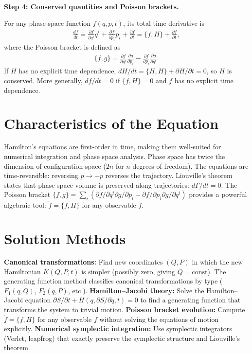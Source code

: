\documentclass[11pt,openright]{book}
\begin{document}
\textbf{Step 4: Conserved quantities and Poisson brackets.}

For any phase-space function $f(q, p, t)$, its total time derivative is
\begin{align}
\frac{df}{dt} = \frac{\partial f}{\partial q^i}\dot{q}^i + \frac{\partial f}{\partial p_i}\dot{p}_i + \frac{\partial f}{\partial t} = \{f, H\} + \frac{\partial f}{\partial t},
\end{align}
where the Poisson bracket is defined as
\begin{align}
\{f, g\} = \frac{\partial f}{\partial q^i}\frac{\partial g}{\partial p_i} - \frac{\partial f}{\partial p_i}\frac{\partial g}{\partial q^i}.
\end{align}
If $H$ has no explicit time dependence, $dH/dt = \{H, H\} + \partial H/\partial t = 0$, so $H$ is conserved. More generally, $df/dt = 0$ if $\{f, H\} = 0$ and $f$ has no explicit time dependence.

\section*{Characteristics of the Equation}

Hamilton's equations are first-order in time, making them well-suited for numerical integration and phase space analysis. Phase space has twice the dimension of configuration space ($2n$ for $n$ degrees of freedom). The equations are time-reversible: reversing $p \to -p$ reverses the trajectory. Liouville's theorem states that phase space volume is preserved along trajectories: $d\Gamma/dt = 0$. The Poisson bracket $\{f, g\} = \sum_i(\partial f/\partial q^i \partial g/\partial p_i - \partial f/\partial p_i \partial g/\partial q^i)$ provides a powerful algebraic tool: $\dot{f} = \{f, H\}$ for any observable $f$.
\section*{Solution Methods}

\textbf{Canonical transformations:} Find new coordinates $(Q, P)$ in which the new Hamiltonian $K(Q, P, t)$ is simpler (possibly zero, giving $Q = \text{const}$). The generating function method classifies canonical transformations by type ($F_1(q,Q)$, $F_2(q,P)$, etc.). \textbf{Hamilton--Jacobi theory:} Solve the Hamilton--Jacobi equation $\partial S/\partial t + H(q, \partial S/\partial q, t) = 0$ to find a generating function that transforms the system to trivial motion. \textbf{Poisson bracket evolution:} Compute $\dot{f} = \{f, H\}$ for any observable $f$ without solving the equations of motion explicitly. \textbf{Numerical symplectic integration:} Use symplectic integrators (Verlet, leapfrog) that exactly preserve the symplectic structure and Liouville's theorem.
\end{document}
